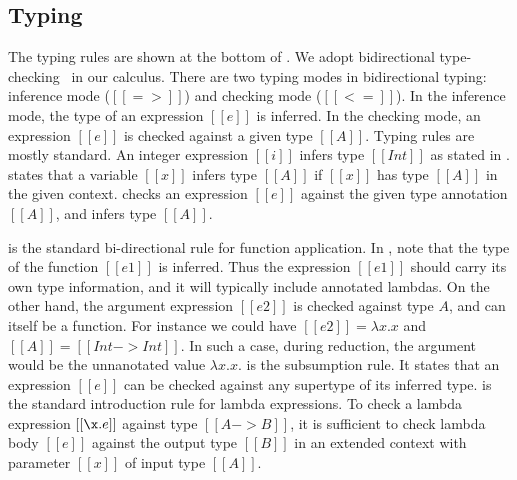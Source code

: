 \subsection{Typing}
\label{sec:union:typ}
The typing rules are shown at the bottom of .
We adopt bidirectional type-checking~\cite{} in our calculus.  There
are two typing modes in bidirectional typing: inference mode
($[[=>]]$) and checking mode ($[[<=]]$). In the inference mode, the type of
an expression $[[e]]$ is inferred.  In the checking
mode, an expression $[[e]]$ is checked against a given type $[[A]]$.
Typing rules are mostly standard. An integer
expression $[[i]]$ infers type $[[Int]]$ as stated in .
 states that a variable $[[x]]$ infers type $[[A]]$ if
$[[x]]$ has type $[[A]]$ in the given context. 
checks an expression $[[e]]$ against the given type annotation $[[A]]$,
and infers type $[[A]]$.

 is the standard bi-directional rule for
function application. In , note that the type of the
function $[[e1]]$ is inferred. Thus the expression $[[e1]]$ should carry
its own type information, and it will typically include annotated lambdas.
On the other hand, the argument expression $[[e2]]$ is checked against type $A$,
and can itself be a function. For instance we could have $[[e2]] = \lambda x. x$
and $[[A]] = [[Int->Int]]$. In such a case, during reduction, the argument would be
the unnanotated value $\lambda x. x$.
 is the subsumption rule. It states that an expression
$[[e]]$ can be checked against any supertype of its inferred type.
 is the standard introduction rule for lambda
expressions. To check a lambda expression $[[\x.e]]$ against type $[[A
    -> B]]$, it is sufficient to check lambda body $[[e]]$ against the
output type $[[B]]$ in an extended context with parameter $[[x]]$ of
input type $[[A]]$.

